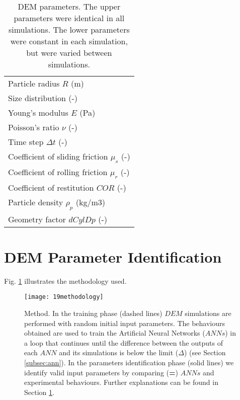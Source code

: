 \documentclass{llncs}
\begin{document}
%
\begin{table}[h]
\centering
\begin{tabular}{l}
\hline 
     Particle radius $R$ (m)   \\ [5pt]

	Size distribution (-) \\ [5pt]

    Young's modulus $E$ (Pa)  \\ [5pt]

    Poisson's ratio $\nu$ (-) \\ 
     Time step $\Delta t$ (-) \\ [5pt]
        \hline
     Coefficient of sliding friction $\mu_s$ (-)\\  [5pt]
    Coefficient of rolling friction $\mu_r$ (-) \\ [5pt]
    Coefficient of restitution $COR$ (-)   \\ [5pt]
     Particle density $\rho_p$ (kg/m3)  \\ [5pt]
    Geometry factor $dCylDp$ (-)  \\ [5pt]
   
\hline
\end{tabular}
\caption[DEM parameters]{DEM parameters. The upper parameters were
identical in all simulations. The lower parameters were constant in each
simulation, but were varied between simulations.}
\label{tab:08DEMparameters}
\end{table}

\section{DEM Parameter Identification}
\label{sec:methodology}

Fig. \ref{fig:19methodology} illustrates the methodology used.

\begin{figure}[!htb] 
\centering 
\texttt{[image: 19methodology]} 
\caption[Method]{Method. 
In the training phase (dashed lines)
$DEM$ simulations are performed
with random initial input parameters.
The behaviours obtained are used to train the
Artificial Neural Networks ($ANNs$) in a loop that continues until the
difference between the outputs of each $ANN$ and its simulations is below the
limit ($\Delta$) (see Section \ref{subsec:ann}).
In the parameters identification phase (solid
lines) we identify valid input parameters by comparing (\textbf{=}) $ANNs$ and
experimental behaviours.
Further explanations can be found in Section \ref{sec:methodology}.
}
\label{fig:19methodology} 
\end{figure}
\end{document}
